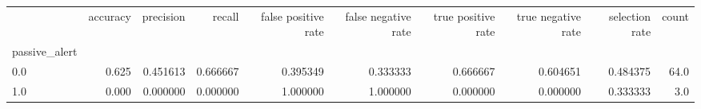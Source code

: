 \begin{tabular}{lrrrrrrrrr}
\toprule
{} &  accuracy &  precision &    recall &  false positive rate &  false negative rate &  true positive rate &  true negative rate &  selection rate &  count \\
passive\_alert &           &            &           &                      &                      &                     &                     &                 &        \\
\midrule
0.0           &     0.625 &   0.451613 &  0.666667 &             0.395349 &             0.333333 &            0.666667 &            0.604651 &        0.484375 &   64.0 \\
1.0           &     0.000 &   0.000000 &  0.000000 &             1.000000 &             1.000000 &            0.000000 &            0.000000 &        0.333333 &    3.0 \\
\bottomrule
\end{tabular}
